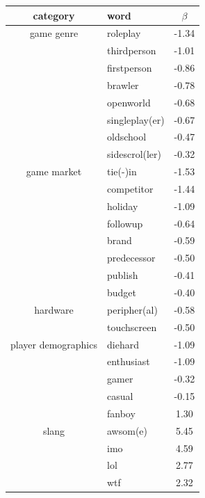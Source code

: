 \documentclass[letterpaper]{article}
\begin{document}
\begin{table}[tb]
\begin{tabularx}{\linewidth}{|c|Xc|}
\hline category & word & $\beta$ \\ 

\hline  game genre 
& roleplay & -1.34 \\
& thirdperson & -1.01 \\
& firstperson &-0.86 \\
& brawler & -0.78 \\
& openworld & -0.68 \\
& singleplay(er) & -0.67 \\
& oldschool & -0.47 \\
& sidescrol(ler) & -0.32 \\ 

\hline game market 
& tie(-)in & -1.53 \\
& competitor & -1.44 \\ 
& holiday & -1.09 \\ 
& followup & -0.64 \\ 
& brand & -0.59 \\ 
& predecessor & -0.50 \\ 
& publish & -0.41 \\ 
& budget & -0.40 \\ 

\hline hardware 
& peripher(al) & -0.58 \\ 
& touchscreen & -0.50 \\ 

\hline player demographics 
& diehard & -1.09 \\ 
& enthusiast & -1.09 \\ 
& gamer & -0.32 \\ 
& casual & -0.15 \\ 
& fanboy & 1.30 \\ 

\hline slang 
& awsom(e) & 5.45 \\ 
& imo & 4.59 \\ 
& lol & 2.77 \\ 
& wtf & 2.32 \\ 


\end{tabularx}
\end{table}
\end{document}
